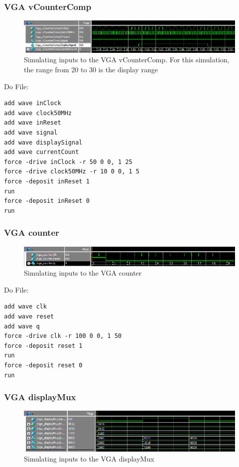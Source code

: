 \documentclass[a4paper]{article}
\begin{document}
\subsubsection{VGA vCounterComp}

\begin{figure}[H]
    \includegraphics[width=0.8 \linewidth]{images/vgaVCounterCompSim.png}
    \caption{Simulating inputs to the VGA vCounterComp. For this simulation, the range from 20 to 30 is the display range}
    \label{vgaVCounterCompSim}
\end{figure}

Do File:

\begin{Verbatim}
add wave inClock
add wave clock50MHz
add wave inReset
add wave signal
add wave displaySignal
add wave currentCount
force -drive inClock -r 50 0 0, 1 25
force -drive clock50MHz -r 10 0 0, 1 5
force -deposit inReset 1
run
force -deposit inReset 0
run
\end{Verbatim}

\subsubsection{VGA counter}

\begin{figure}[H]
    \includegraphics[width=0.8 \linewidth]{images/vgaCounterSim.png}
    \caption{Simulating inputs to the VGA counter}
    \label{vgaCounterSim}
\end{figure}

Do File:

\begin{Verbatim}
add wave clk
add wave reset
add wave q
force -drive clk -r 100 0 0, 1 50
force -deposit reset 1
run
force -deposit reset 0
run
\end{Verbatim}

\subsubsection{VGA displayMux}

\begin{figure}[H]
    \includegraphics[width=0.8 \linewidth]{images/vgaDisplayMuxSim.png}
    \caption{Simulating inputs to the VGA displayMux}
    \label{vgaDisplayMuxSim}
\end{figure}
\end{document}
